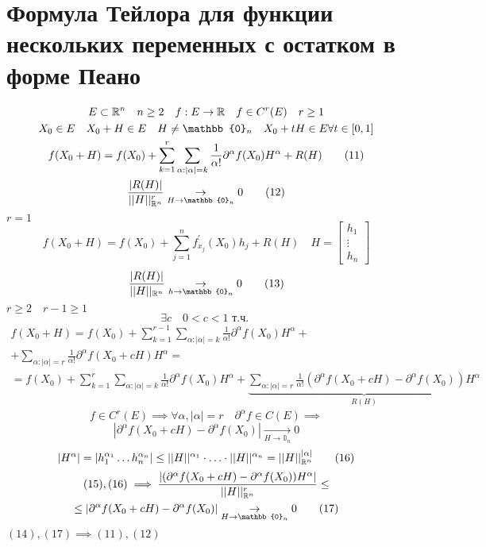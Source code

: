 \documentclass[main]{subfiles}
\begin{document}
\section{Формула Тейлора для функции нескольких переменных с остатком в форме Пеано}

\begin{gather*}
    E \subset \vR^n \quad n \geq 2 \quad f: E \rightarrow \vR \quad f \in C^r(E) \quad r \geq 1 \\
    X_0 \in E \quad X_0 + H \in E \quad H \ne \mathbb{0}_n  \quad X_0 + tH \in E \forall t \in [0,1] \\
    f(X_0 + H) = f(X_0) + \sum^r_{k=1} \sum_{\alpha: |\alpha| = k} \frac{1}{\alpha!} \partial^\alpha f (X_0) H^\alpha + R(H) \tag{11}\\
    \frac{|R(H)|}{||H||_{\vR^n}^r} \underset{H \to \mathbb{0}_n}{\rightarrow} 0 \tag{12} \\
\end{gather*}
$r=1$
\[ f(X_0+H) = f(X_0) + \sum^n_{j=1} f^\prime_{x_j}(X_0)h_j + R(H) \quad H = \begin{bmatrix}
    h_1 \\
    \vdots \\
    h_n
\end{bmatrix} \tag{13\prime}\]
\[\frac{|R(H)|}{||H||_{\vR^n}} \underset{h \to \mathbb{0}_n}{\rightarrow} 0 \tag{13} \]
$r \geq 2 \quad r - 1 \geq 1 $
    \[\exists c \quad 0  < c < 1 \text{ т.ч. } \]
    \begin{multline*}
        f(X_0+H) = f(X_0) + \sum^{r-1}_{k=1}\sum_{\alpha: |\alpha| = k} \frac{1}{\alpha!} \partial^\alpha f(X_0)H^\alpha + \\
        + \sum_{\alpha: |\alpha| = r} \frac{1}{\alpha!} \partial^\alpha f(X_0 + cH) H^\alpha = \\
        = f(X_0) + \sum_{k=1}^r \sum_{\alpha: |\alpha| = k} \frac{1}{\alpha!} \partial^\alpha f(X_0) H^\alpha + 
        \underbrace{\sum_{\alpha: |\alpha|=r} \frac{1}{\alpha!}(\partial^\alpha f(X_0 + cH) - \partial^\alpha f(X_0))H^\alpha}_{R(H)} \tag{14} 
    \end{multline*}
    \[f \in C^r(E) \implies \forall \alpha, |\alpha| = r \quad \partial^\alpha f \in C(E) \implies \] 
    \[ |\partial^\alpha f(X_0 + cH) - \partial^\alpha f(X_0)| \underset{H \to \mathbb{0}_n}{\rightarrow} 0  \tag{15} \]
    \[|H^\alpha| = |h_1^{\alpha_1} \ldots h_n^{\alpha_n}| \leq ||H||^{\alpha_1} \cdot \ldots \cdot ||H||^{\alpha_n} = ||H||^{|\alpha|}_{\mathbb{R}^n} \tag{16} \]
    \begin{multline*}
        (15), (16) \implies \frac{|(\partial^\alpha f (X_0 + cH) - \partial^\alpha f(X_0))H^\alpha|}{||H||_{\vR^n}^r} \leq \\
    \leq |\partial^\alpha f(X_0 + cH) - \partial^\alpha f(X_0)| \underset{H \to \mathbb{0}_n}{\rightarrow}  0 \tag{17}
    \end{multline*}
    $(14), (17) \implies (11), (12) $
\end{document}

